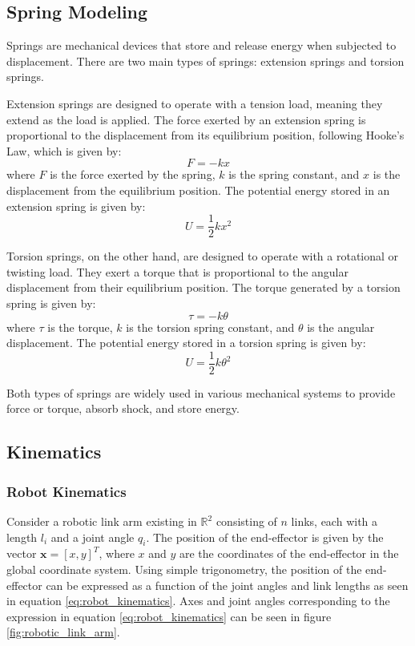\subsection{Spring Modeling}
\label{sec:spring_theory}
Springs are mechanical devices that store and release energy when subjected to displacement. There are two main types of springs: extension springs and torsion springs.

Extension springs are designed to operate with a tension load, meaning they extend as the load is applied. The force exerted by an extension spring is proportional to the displacement from its equilibrium position, following Hooke's Law, which is given by:
\begin{equation}
    F = -kx
\end{equation}
where \( F \) is the force exerted by the spring, \( k \) is the spring constant, and \( x \) is the displacement from the equilibrium position. The potential energy stored in an extension spring is given by:
\begin{equation}
    U = \frac{1}{2}kx^2
\end{equation}

Torsion springs, on the other hand, are designed to operate with a rotational or twisting load. They exert a torque that is proportional to the angular displacement from their equilibrium position. The torque generated by a torsion spring is given by:
\begin{equation}
    \tau = -k\theta
\end{equation}
where \( \tau \) is the torque, \( k \) is the torsion spring constant, and \( \theta \) is the angular displacement. The potential energy stored in a torsion spring is given by:
\begin{equation}
    U = \frac{1}{2}k\theta^2
\end{equation}

Both types of springs are widely used in various mechanical systems to provide force or torque, absorb shock, and store energy.

\subsection{Kinematics}
    \subsubsection{Robot Kinematics}
    \label{sec:robot_kinematics}
Consider a robotic link arm existing in $\mathbb{R}^2$ consisting of $n$ links, each with a length $l_i$ and a joint angle $q_i$. The position of the end-effector is given by the vector $\mathbf{x} = [x, y]^T$, where $x$ and $y$ are the coordinates of the end-effector in the global coordinate system. Using simple trigonometry, the position of the end-effector can be expressed as a function of the joint angles and link lengths as seen in equation \ref{eq:robot_kinematics}. 
Axes and joint angles corresponding to the expression in equation \ref{eq:robot_kinematics} can be seen in figure \ref{fig:robotic_link_arm}. 

